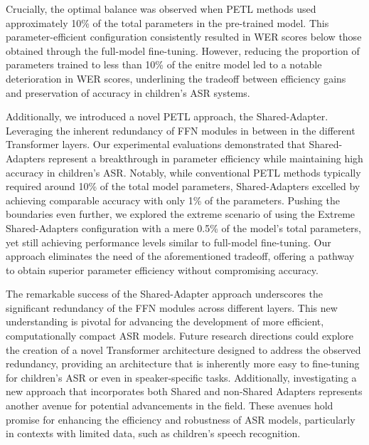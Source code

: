 Crucially, the optimal balance was observed when PETL methods used approximately 10\% of the total parameters in the pre-trained model. This parameter-efficient configuration consistently resulted in WER scores below those obtained through the full-model fine-tuning. However, reducing the proportion of parameters trained to less than 10\% of the enitre model led to a notable deterioration in WER scores, underlining the tradeoff between efficiency gains and preservation of accuracy in children's ASR systems.


Additionally, we introduced a novel PETL approach, the Shared-Adapter. Leveraging the inherent redundancy of FFN modules in between in the different Transformer layers. Our experimental evaluations demonstrated that Shared-Adapters represent a breakthrough in parameter efficiency while maintaining high accuracy in children's ASR. Notably, while conventional PETL methods typically required around 10\% of the total model parameters, Shared-Adapters excelled by achieving comparable accuracy with only 1\% of the parameters. Pushing the boundaries even further, we explored the extreme scenario of using the Extreme Shared-Adapters configuration with a mere 0.5\% of the model's total parameters, yet still achieving performance levels similar to full-model fine-tuning. Our approach eliminates the need of the aforementioned tradeoff, offering a pathway to obtain superior parameter efficiency without compromising accuracy.

The remarkable success of the Shared-Adapter approach underscores the significant redundancy of the FFN modules across different layers. This new understanding is pivotal for advancing the development of more efficient, computationally compact ASR models. Future research directions could explore the creation of a novel Transformer architecture designed to address the observed redundancy, providing an architecture that is inherently more easy to fine-tuning for children's ASR or even in speaker-specific tasks. Additionally, investigating a new approach that incorporates both Shared and non-Shared Adapters represents another avenue for potential advancements in the field. These avenues hold promise for enhancing the efficiency and robustness of ASR models, particularly in contexts with limited data, such as children's speech recognition.